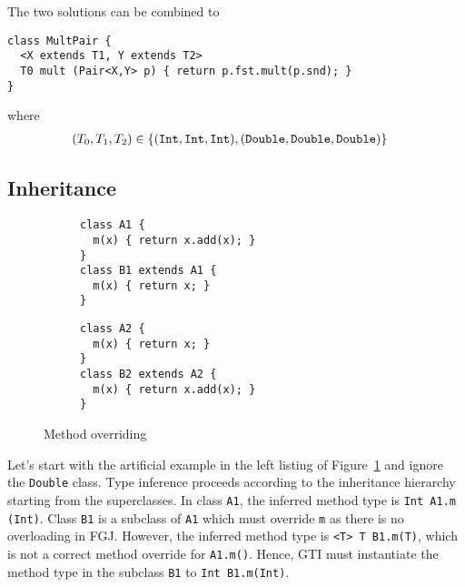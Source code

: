 
The two solutions can be combined to
\begin{lstlisting}[style=fgj]
class MultPair {
  <X extends T1, Y extends T2>
  T0 mult (Pair<X,Y> p) { return p.fst.mult(p.snd); }
}
\end{lstlisting}
where
\begin{align*}
  (T_0, T_1, T_2) & \in \{ ({\tt Int}, {\tt Int}, {\tt Int}), ({\tt Double}, {\tt Double}, {\tt Double}) \}
\end{align*}

\subsection{Inheritance}
\label{sec:inheritance}

\begin{figure}[tp]
  \begin{subfigure}[t]{0.49\linewidth}
\begin{lstlisting}[style=tfgj]
class A1 {
  m(x) { return x.add(x); }
}
class B1 extends A1 {
  m(x) { return x; }
}
\end{lstlisting}
  \end{subfigure}
\begin{subfigure}[t]{0.49\linewidth}
\begin{lstlisting}[style=tfgj]
class A2 {
  m(x) { return x; }
}
class B2 extends A2 {
  m(x) { return x.add(x); }
}
\end{lstlisting}
  \end{subfigure}
  \caption{Method overriding}
  \label{fig:method-overriding}
\end{figure}

Let's start with the artificial example in the left
listing of Figure~\ref{fig:method-overriding} and ignore the \texttt{Double} class. Type
inference proceeds according 
to the inheritance hierarchy starting from the superclasses. In class
\texttt{A1}, the inferred method type is \texttt{Int A1.m (Int)}. Class \texttt{B1} is a
subclass of \texttt{A1} which must override \texttt{m} as there is no
overloading in FGJ. However, the inferred method 
type is \texttt{<T> T B1.m(T)}, which is not a correct
method override for \texttt{A1.m()}.
Hence, GTI must instantiate the method type in the subclass \texttt{B1} to
\texttt{Int B1.m(Int)}.

